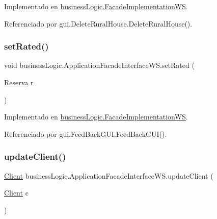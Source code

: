 Implementado en \mbox{\hyperlink{classbusiness_logic_1_1_facade_implementation_w_s_a4d0fe8c220dc334e527a3e7b4cc9edca}{business\+Logic.\+Facade\+Implementation\+WS}}.



Referenciado por gui.\+Delete\+Rural\+House.\+Delete\+Rural\+House().

\mbox{\label{interfacebusiness_logic_1_1_application_facade_interface_w_s_a0092e0a845b7b23dc504be013ce1958a}} 
\subsubsection{\texorpdfstring{setRated()}{setRated()}}
{\footnotesize\ttfamily void business\+Logic.\+Application\+Facade\+Interface\+W\+S.\+set\+Rated (\begin{DoxyParamCaption}\item[{\mbox{\hyperlink{classdomain_1_1_reserva}{Reserva}}}]{r }\end{DoxyParamCaption})}



Implementado en \mbox{\hyperlink{classbusiness_logic_1_1_facade_implementation_w_s_a4ed81cb9f24d501da830d80dda086fce}{business\+Logic.\+Facade\+Implementation\+WS}}.



Referenciado por gui.\+Feed\+Back\+G\+U\+I.\+Feed\+Back\+G\+U\+I().

\mbox{\label{interfacebusiness_logic_1_1_application_facade_interface_w_s_a2d053769d923bd1987f8fd1f875905e7}} 
\subsubsection{\texorpdfstring{updateClient()}{updateClient()}}
{\footnotesize\ttfamily \mbox{\hyperlink{classdomain_1_1_client}{Client}} business\+Logic.\+Application\+Facade\+Interface\+W\+S.\+update\+Client (\begin{DoxyParamCaption}\item[{\mbox{\hyperlink{classdomain_1_1_client}{Client}}}]{c }\end{DoxyParamCaption})}



